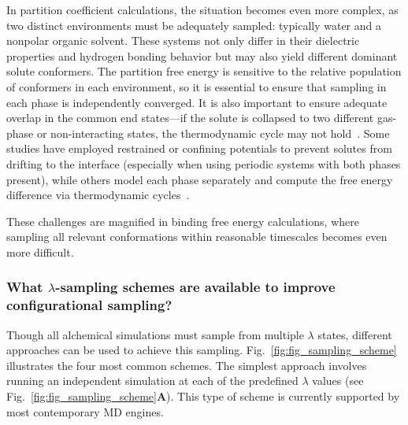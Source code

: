 \documentclass[9pt,bestpractices]{livecoms}
\begin{document}
In partition coefficient calculations, the situation becomes even more complex, as two distinct environments must be adequately sampled: typically water and a nonpolar organic solvent. These systems not only differ in their dielectric properties and hydrogen bonding behavior but may also yield different dominant solute conformers. The partition free energy is sensitive to the relative population of conformers in each environment, so it is essential to ensure that sampling in each phase is independently converged. It is also important to ensure adequate overlap in the common end states—if the solute is collapsed to two different gas-phase or non-interacting states, the thermodynamic cycle may not hold~\cite{fan2021sampl7}. Some studies have employed restrained or confining potentials to prevent solutes from drifting to the interface (especially when using periodic systems with both phases present), while others model each phase separately and compute the free energy difference via thermodynamic cycles~\cite{turchi2019,bannan2016,petris2021}.

These challenges are magnified in binding free energy calculations, where sampling all relevant conformations within reasonable timescales becomes even more difficult.

\subsubsection{What $\lambda$-sampling schemes are available to improve configurational sampling?}
\label{sec:sampling_schemes}
Though all alchemical simulations must sample from multiple $\lambda$ states, different approaches can be used to achieve this sampling. Fig.~\ref{fig:fig_sampling_scheme} illustrates the four most common schemes. The simplest approach involves running an independent simulation at each of the predefined $\lambda$ values (see Fig.~\ref{fig:fig_sampling_scheme}\textbf{A}). This type of scheme is currently supported by most contemporary MD engines.
\end{document}
